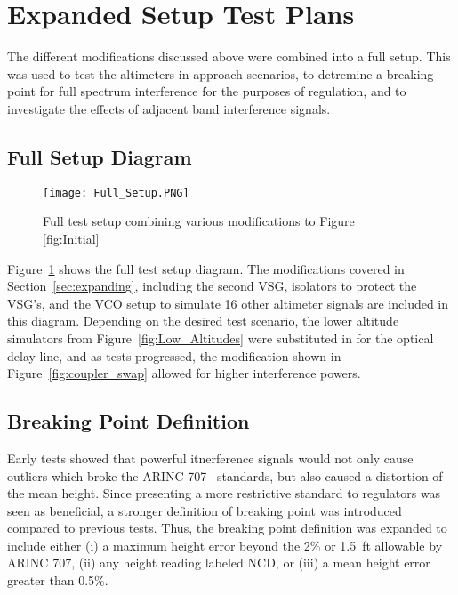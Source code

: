 \section{Expanded Setup Test Plans}
The different modifications discussed above were combined into a full setup. This was used to test the altimeters in approach scenarios, to detremine a breaking point for full spectrum interference for the purposes of regulation, and to investigate the effects of adjacent band interference signals.
\subsection{Full Setup Diagram}
\begin{figure}[ht]
\centering
\texttt{[image: Full\_Setup.PNG]}
\caption{Full test setup combining various modifications to Figure~
\ref{fig:Initial}}

\label{fig:combined}

\end{figure}
Figure~\ref{fig:combined} shows the full test setup diagram. The modifications covered in Section~\ref{sec:expanding}, including the second VSG, isolators to protect the VSG's, and the VCO setup to simulate 16 other altimeter signals are included in this diagram. Depending on the desired test scenario, the lower altitude simulators from Figure~\ref{fig:Low_Altitudes} were substituted in for the optical delay line, and as tests progressed, the modification shown in Figure~\ref{fig:coupler_swap} allowed for higher interference powers. 

\subsection{Breaking Point Definition}\label{sub:break}
Early tests showed that powerful itnerference signals would not only cause outliers which broke the ARINC 707~\cite{noauthor_arinc_2009} standards, but also caused a distortion of the mean height. Since presenting a more restrictive standard to regulators was seen as beneficial, a stronger definition of breaking point was introduced compared to previous tests. Thus, the breaking point definition was expanded to include either (i) a maximum height error beyond the 2\% or 1.5~ft allowable by ARINC 707, (ii) any height reading labeled NCD, or (iii) a mean height error greater than 0.5\%. 

